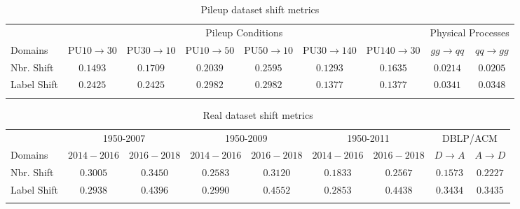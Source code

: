 \begin{table}[h!]
\caption{Pileup dataset shift metrics}
\vspace{2mm}
\begin{center}
\begin{adjustbox}{width = 0.95\textwidth}
\begin{sc}
\begin{tabular}{lcccccccc}
\toprule
& \multicolumn{6}{c}{Pileup Conditions} & \multicolumn{2}{c}{Physical Processes} \\
 Domains  & $\text{PU}10 \rightarrow 30$    & $\text{PU}30 \rightarrow 10$ & PU$10\rightarrow 50$ & PU$50\rightarrow 10$ & PU$30\rightarrow 140$ & PU$140\rightarrow 30$ &$gg \rightarrow qq$      &     $qq \rightarrow gg$      \\
\midrule
Nbr. Shift        & $0.1493$ & $0.1709$ & $0.2039$    &$0.2595$    & $0.1293$     &  $0.1635$  & $0.0214$     &  $0.0205$   \\
Label Shift       & $0.2425$ & $0.2425$ & $0.2982$    &$0.2982$    & $0.1377$     &  $0.1377$  & $0.0341$     &  $0.0348$  \\

\bottomrule
\label{table:hepstats}
\end{tabular}
\end{sc}
\end{adjustbox}
\end{center}
\vskip -0.7cm
\end{table}


\begin{table}[h!]
\caption{Real dataset shift metrics}
\vspace{2mm}
\begin{center}
\begin{adjustbox}{width = 0.95\textwidth}
\begin{sc}
\begin{tabular}{lcccccccc}
\toprule
 & \multicolumn{2}{c}{1950-2007} & \multicolumn{2}{c}{1950-2009} & \multicolumn{2}{c}{1950-2011} & \multicolumn{2}{c}{DBLP/ACM}\\
 Domains  & $2014-2016$    & $2016-2018$ & $2014-2016$ & $2016-2018$ & $2014-2016$ & $2016-2018$   & $D\rightarrow A$ & $A\rightarrow D$\\
\midrule
Nbr. Shift         
& $0.3005$ & $0.3450$ & $0.2583$    &$0.3120$    & $0.1833$     &  $0.2567$   & $0.1573$     &  $0.2227$   \\
Label Shift        
& $0.2938$ & $0.4396$ & $0.2990$    &$0.4552$    & $0.2853$     &  $0.4438$   & $0.3434$     &  $0.3435$ \\

\bottomrule
\label{table:realstats}
\end{tabular}
\end{sc}
\end{adjustbox}
\end{center}
\vskip -0.7cm
\end{table}
